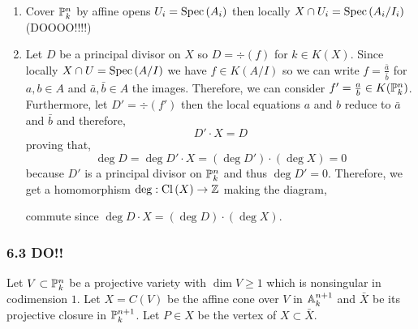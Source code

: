 \documentclass[12pt]{article}
\begin{document}
\begin{enumerate}
\item Cover $\P^n_k$ by affine opens $U_i = \Spec{A_i}$ then locally $X \cap U_i = \Spec{A_i / I_i}$ (DOOOO!!!!)

\item Let $D$ be a principal divisor on $X$ so $D = \div{(f)}$ for $k \in K(X)$. Since locally $X \cap U = \Spec{A/I}$ we have $f \in K(A/I)$ so we can write $f = \frac{\bar{a}}{\bar{b}}$ for $a, b \in A$ and $\bar{a}, \bar{b} \in A$ the images. Therefore, we can consider $f' = \frac{a}{b} \in K(\P^n_k)$. Furthermore, let $D' = \div{(f')}$ then the local equations $a$ and $b$ reduce to $\bar{a}$ and $\bar{b}$ and therefore,
\[ D' \cdot X = D \]
proving that,
\[ \deg{D} = \deg{D' \cdot X} = (\deg{D'}) \cdot (\deg{X}) = 0 \]
because $D'$ is a principal divisor on $\P^n_k$ and thus $\deg{D'} = 0$. Therefore, we get a homomorphism $\deg : \Cl{X} \to \Z$ making the diagram,
\begin{center}
\end{center}
commute since $\deg{D \cdot X} = (\deg{D}) \cdot (\deg{X})$.
\end{enumerate}

\subsubsection{6.3 DO!!}

Let $V \subset \P^n_k$ be a projective variety with $\dim{V} \ge 1$ which is nonsingular in codimension $1$. Let $X = C(V)$ be the affine cone over $V$ in $\A^{n+1}_k$ and $\bar{X}$ be its projective closure in $\P^{n+1}_k$. Let $P \in X$ be the vertex of $X \subset \bar{X}$. 
\end{document}
